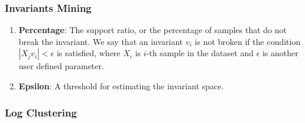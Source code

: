\subsubsection*{Invariants Mining}
\begin{enumerate}
    \item \textbf{Percentage}: The support ratio, or the percentage of samples that do not break the invariant. We say that an invariant $v_i$ is not broken if the condition $|X_j v_i| < \epsilon $ is satisfied, where $X_i$ is $i$-th sample in the dataset and $\epsilon$ is another user defined parameter. 
    \item \textbf{Epsilon}: A threshold for estimating the invariant space.
\end{enumerate}

\subsubsection*{Log Clustering}

